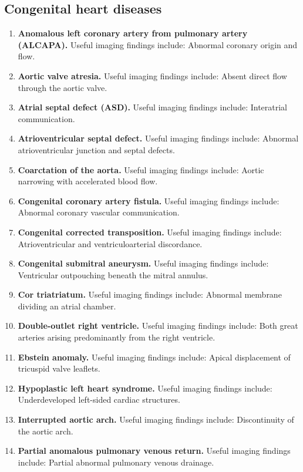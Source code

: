 \subsection{Congenital heart diseases}
\begin{enumerate}[leftmargin=*,itemsep=0.45em,topsep=0.4em]
\item \textbf{Anomalous left coronary artery from pulmonary artery (ALCAPA).} Useful imaging findings include: Abnormal coronary origin and flow.
\item \textbf{Aortic valve atresia.} Useful imaging findings include: Absent direct flow through the aortic valve.
\item \textbf{Atrial septal defect (ASD).} Useful imaging findings include: Interatrial communication.
\item \textbf{Atrioventricular septal defect.} Useful imaging findings include: Abnormal atrioventricular junction and septal defects.
\item \textbf{Coarctation of the aorta.} Useful imaging findings include: Aortic narrowing with accelerated blood flow.
\item \textbf{Congenital coronary artery fistula.} Useful imaging findings include: Abnormal coronary vascular communication.
\item \textbf{Congenital corrected transposition.} Useful imaging findings include: Atrioventricular and ventriculoarterial discordance.
\item \textbf{Congenital submitral aneurysm.} Useful imaging findings include: Ventricular outpouching beneath the mitral annulus.
\item \textbf{Cor triatriatum.} Useful imaging findings include: Abnormal membrane dividing an atrial chamber.
\item \textbf{Double-outlet right ventricle.} Useful imaging findings include: Both great arteries arising predominantly from the right ventricle.
\item \textbf{Ebstein anomaly.} Useful imaging findings include: Apical displacement of tricuspid valve leaflets.
\item \textbf{Hypoplastic left heart syndrome.} Useful imaging findings include: Underdeveloped left-sided cardiac structures.
\item \textbf{Interrupted aortic arch.} Useful imaging findings include: Discontinuity of the aortic arch.
\item \textbf{Partial anomalous pulmonary venous return.} Useful imaging findings include: Partial abnormal pulmonary venous drainage.

\end{enumerate}
